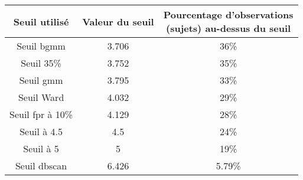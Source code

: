 \fontsize{9}{11}\selectfont
\begin{tabular}{ ccc }
\toprule
Seuil utilisé & Valeur du seuil & \shortstack{Pourcentage d'observations \\ (sujets) au-dessus du seuil} \\
\midrule
Seuil \gls{bgmm} & 3.706 & 36\% \\
Seuil 35\% & 3.752 & 35\% \\
Seuil \gls{gmm} & 3.795 & 33\%\\
Seuil Ward & 4.032 & 29\% \\
Seuil \gls{fpr} à 10\% & 4.129 & 28\% \\
Seuil à 4.5 & 4.5 & 24\% \\
Seuil à 5 & 5 & 19\% \\
Seuil \gls{dbscan} & 6.426 & 5.79\%\\
\bottomrule
\end{tabular}